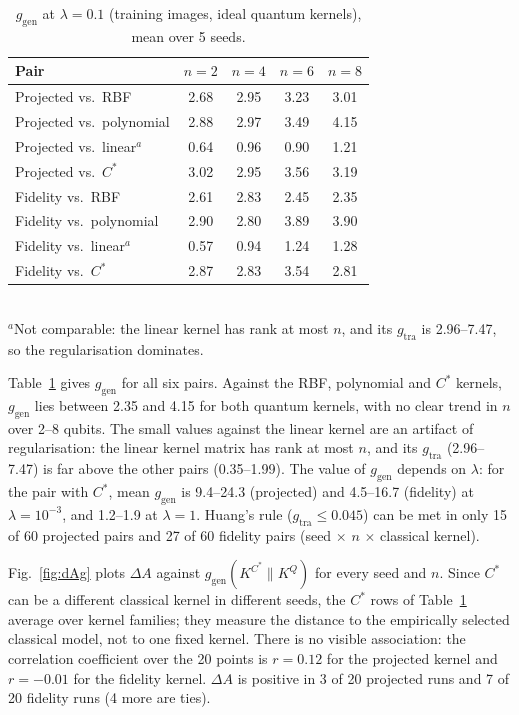 \documentclass[conference]{IEEEtran}
\begin{document}
\begin{table}[t]
\centering
\caption{$g_{\mathrm{gen}}$ at $\lambda=0.1$ (training images, ideal quantum kernels), mean over 5 seeds.}
\label{tab:g}
\footnotesize
\begin{tabular}{@{}lcccc@{}}
\toprule
Pair & $n=2$ & $n=4$ & $n=6$ & $n=8$ \\
\midrule
Projected vs.\ RBF & 2.68 & 2.95 & 3.23 & 3.01 \\
Projected vs.\ polynomial & 2.88 & 2.97 & 3.49 & 4.15 \\
Projected vs.\ linear$^{a}$ & 0.64 & 0.96 & 0.90 & 1.21 \\
Projected vs.\ $C^\ast$ & 3.02 & 2.95 & 3.56 & 3.19 \\
\midrule
Fidelity vs.\ RBF & 2.61 & 2.83 & 2.45 & 2.35 \\
Fidelity vs.\ polynomial & 2.90 & 2.80 & 3.89 & 3.90 \\
Fidelity vs.\ linear$^{a}$ & 0.57 & 0.94 & 1.24 & 1.28 \\
Fidelity vs.\ $C^\ast$ & 2.87 & 2.83 & 3.54 & 2.81 \\
\bottomrule
\end{tabular}
\\[2pt]{\footnotesize $^{a}$Not comparable: the linear kernel has rank at most $n$, and its $g_{\mathrm{tra}}$ is 2.96--7.47, so the regularisation dominates.}
\end{table}

Table~\ref{tab:g} gives $g_{\mathrm{gen}}$ for all six pairs. Against the RBF, polynomial and $C^\ast$ kernels, $g_{\mathrm{gen}}$ lies between 2.35 and 4.15 for both quantum kernels, with no clear trend in $n$ over 2--8 qubits. The small values against the linear kernel are an artifact of regularisation: the linear kernel matrix has rank at most $n$, and its $g_{\mathrm{tra}}$ (2.96--7.47) is far above the other pairs (0.35--1.99). The value of $g_{\mathrm{gen}}$ depends on $\lambda$: for the pair with $C^\ast$, mean $g_{\mathrm{gen}}$ is 9.4--24.3 (projected) and 4.5--16.7 (fidelity) at $\lambda=10^{-3}$, and 1.2--1.9 at $\lambda=1$. Huang's rule ($g_{\mathrm{tra}}\le0.045$) can be met in only 15 of 60 projected pairs and 27 of 60 fidelity pairs (seed $\times$ $n$ $\times$ classical kernel).

Fig.~\ref{fig:dAg} plots $\Delta A$ against $g_{\mathrm{gen}}(K^{C^\ast}\|K^Q)$ for every seed and $n$. Since $C^\ast$ can be a different classical kernel in different seeds, the $C^\ast$ rows of Table~\ref{tab:g} average over kernel families; they measure the distance to the empirically selected classical model, not to one fixed kernel. There is no visible association: the correlation coefficient over the 20 points is $r=0.12$ for the projected kernel and $r=-0.01$ for the fidelity kernel. $\Delta A$ is positive in 3 of 20 projected runs and 7 of 20 fidelity runs (4 more are ties).
\end{document}
